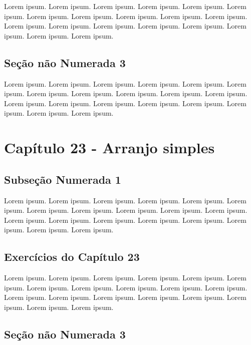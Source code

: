 \documentclass[
]{book}
\begin{document}
Lorem ipsum. Lorem ipsum. Lorem ipsum. Lorem ipsum. Lorem ipsum. Lorem ipsum. Lorem ipsum. Lorem ipsum. Lorem ipsum. Lorem ipsum. Lorem ipsum. Lorem ipsum. Lorem ipsum. Lorem ipsum. Lorem ipsum. Lorem ipsum. Lorem ipsum. Lorem ipsum. Lorem ipsum.

\hypertarget{seuxe7uxe3o-nuxe3o-numerada-3-6}{%
\subsection*{Seção não Numerada 3}\label{seuxe7uxe3o-nuxe3o-numerada-3-6}}

Lorem ipsum. Lorem ipsum. Lorem ipsum. Lorem ipsum. Lorem ipsum. Lorem ipsum. Lorem ipsum. Lorem ipsum. Lorem ipsum. Lorem ipsum. Lorem ipsum. Lorem ipsum. Lorem ipsum. Lorem ipsum. Lorem ipsum. Lorem ipsum. Lorem ipsum. Lorem ipsum. Lorem ipsum.

\hypertarget{capuxedtulo-23---arranjo-simples-2}{%
\section{Capítulo 23 - Arranjo simples}\label{capuxedtulo-23---arranjo-simples-2}}

\hypertarget{subseuxe7uxe3o-numerada-1-7}{%
\subsection{Subseção Numerada 1}\label{subseuxe7uxe3o-numerada-1-7}}

Lorem ipsum. Lorem ipsum. Lorem ipsum. Lorem ipsum. Lorem ipsum. Lorem ipsum. Lorem ipsum. Lorem ipsum. Lorem ipsum. Lorem ipsum. Lorem ipsum. Lorem ipsum. Lorem ipsum. Lorem ipsum. Lorem ipsum. Lorem ipsum. Lorem ipsum. Lorem ipsum. Lorem ipsum.

\hypertarget{exercuxedcios-do-capuxedtulo-23-2}{%
\subsection{Exercícios do Capítulo 23}\label{exercuxedcios-do-capuxedtulo-23-2}}

Lorem ipsum. Lorem ipsum. Lorem ipsum. Lorem ipsum. Lorem ipsum. Lorem ipsum. Lorem ipsum. Lorem ipsum. Lorem ipsum. Lorem ipsum. Lorem ipsum. Lorem ipsum. Lorem ipsum. Lorem ipsum. Lorem ipsum. Lorem ipsum. Lorem ipsum. Lorem ipsum. Lorem ipsum.

\hypertarget{seuxe7uxe3o-nuxe3o-numerada-3-7}{%
\subsection*{Seção não Numerada 3}\label{seuxe7uxe3o-nuxe3o-numerada-3-7}}
\end{document}
